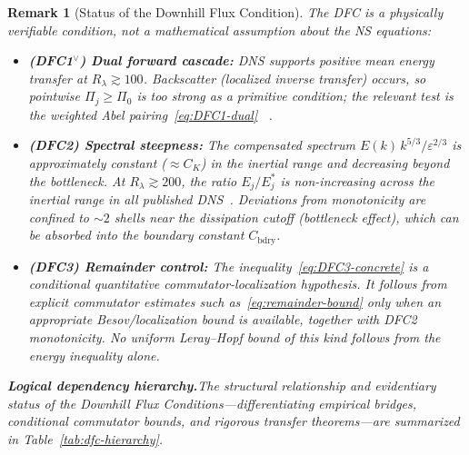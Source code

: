\documentclass[12pt,a4paper]{article}
\theoremstyle{breakdef}
\theoremstyle{breakplain}
\theoremstyle{breakdef}
\newtheorem{remark}[definition]{Remark}
\begin{document}
\begin{remark}[Status of the Downhill Flux Condition]
\label{rem:DFC-status}
The DFC is a \emph{physically verifiable} condition, not a mathematical
assumption about the NS equations:
\begin{itemize}
  \item \textbf{(DFC1$^\vee$) Dual forward cascade:} DNS supports
    positive mean energy transfer at $R_\lambda \gtrsim 100$.
    Backscatter (localized inverse transfer) occurs, so pointwise
    $\Pi_j\ge\Pi_0$ is too strong as a primitive condition; the relevant
    test is the weighted Abel pairing~\eqref{eq:DFC1-dual}
    ~\cite{Frisch95,ES06,Kaneda03,Gotoh02}.
  \item \textbf{(DFC2) Spectral steepness:} The compensated spectrum
    $E(k)\,k^{5/3}/\varepsilon^{2/3}$ is approximately constant
    ($\approx C_K$) in the inertial range and \emph{decreasing} beyond
    the bottleneck. At $R_\lambda \gtrsim 200$, the ratio
    $E_j/E_j^*$ is non-increasing across the inertial range in all
    published DNS~\cite{ES06,Frisch95}. Deviations from monotonicity are
    confined to $\sim 2$ shells near the dissipation cutoff
    (bottleneck effect), which can be absorbed into the boundary
    constant $C_{\mathrm{bdry}}$.
  \item \textbf{(DFC3) Remainder control:} The
    inequality~\eqref{eq:DFC3-concrete} is a conditional quantitative
    commutator-localization hypothesis. It follows from explicit
    commutator estimates such as~\eqref{eq:remainder-bound} only when
    an appropriate Besov/localization bound is available, together with
    DFC2 monotonicity. No uniform Leray--Hopf bound of this kind follows
    from the energy inequality alone.
\end{itemize}

\medskip\noindent
\textbf{Logical dependency hierarchy.}\quad The structural relationship and evidentiary status of the Downhill Flux Conditions---differentiating empirical bridges, conditional commutator bounds, and rigorous transfer theorems---are summarized in Table~\ref{tab:dfc-hierarchy}.
\medskip


\end{remark}
\end{document}
